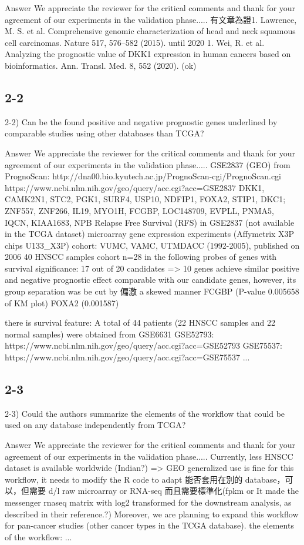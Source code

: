 \documentclass[preprint,12pt]{elsarticle}
\begin{document}
Answer
We appreciate the reviewer for the critical comments and thank for your agreement of our experiments in the validation phase.....
有文章為證1. Lawrence, M. S. et al. Comprehensive genomic characterization of head and neck squamous cell carcinomas. Nature 517, 576–582 (2015).
\cite{Lawrence2015a}
until 2020 1. Wei, R. et al. Analyzing the prognostic value of DKK1 expression in human cancers based on bioinformatics. Ann. Transl. Med. 8, 552 (2020).
\cite{Tang2019}\cite{Wei2020a}
(ok)

\subsection{2-2}
2-2) Can be the found positive and negative prognostic genes underlined by comparable studies using other databases than TCGA?

Answer
We appreciate the reviewer for the critical comments and thank for your agreement of our experiments in the validation phase.....
GSE2837 (GEO) from PrognoScan: http://dna00.bio.kyutech.ac.jp/PrognoScan-cgi/PrognoScan.cgi \cite{Mizuno2009a}
https://www.ncbi.nlm.nih.gov/geo/query/acc.cgi?acc=GSE2837 \cite{Chung2006}
DKK1, CAMK2N1, STC2, PGK1, SURF4, USP10, NDFIP1, FOXA2, STIP1, DKC1;
ZNF557, ZNF266, IL19, MYO1H, FCGBP, LOC148709, EVPLL, PNMA5, IQCN, KIAA1683, NPB
Relapse Free Survival (RFS) in GSE2837 (not available in the TCGA dataset)
microarray gene expression experiments (Affymetrix X3P chips U133_X3P)
cohort: VUMC, VAMC, UTMDACC (1992-2005), published on 2006
40 HNSCC samples
cohort n=28 in the following probes of genes with survival significance:
17 out of 20 candidates => 10 genes achieve similar positive and negative prognostic effect comparable with our candidate genes, however, its group separation was be cut by 偏激 a skewed manner
FCGBP (P-value 0.005658 of KM plot)
FOXA2 (0.001587)

there is survival feature:
A total of 44 patients (22 HNSCC samples and 22 normal samples) were obtained from GSE6631
GSE52793: https://www.ncbi.nlm.nih.gov/geo/query/acc.cgi?acc=GSE52793
GSE75537: https://www.ncbi.nlm.nih.gov/geo/query/acc.cgi?acc=GSE75537
...

\subsection{2-3}
2-3) Could the authors summarize the elements of the workflow that could be used on any database independently from TCGA?


Answer
We appreciate the reviewer for the critical comments and thank for your agreement of our experiments in the validation phase.....
Currently, less HNSCC dataset is available worldwide (Indian?) => GEO
generalized use is fine for this workflow, it needs to modify the R code to adapt 
能否套用在別的 database，可以，但需要 d/l raw microarray or RNA-seq 而且需要標準化(fpkm or  It made the messenger \acrshort{rnaseq} matrix with log2 transformed for the downstream analysis, as described in their reference\cite{RSEM2016}.?)
Moreover, we are planning to expand this workflow for pan-cancer studies (other cancer types in the TCGA database).
the elements of the workflow: ...
\end{document}
